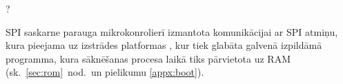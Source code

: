 		\todo ? %
		
		SPI saskarne parauga mikrokonrolierī izmantota
		komunikācijai ar SPI  atmiņu,
		kura pieejama uz izstrādes platformas \cite[43.~lpp.]{FusionGuide},
		kur tiek glabāta galvenā izpildāmā programma, kura sāknēšanas procesa
		laikā tiks pārvietota uz RAM (sk.~\ref{sec:rom}~nod.~un pielikumu \ref{appx:boot}).
